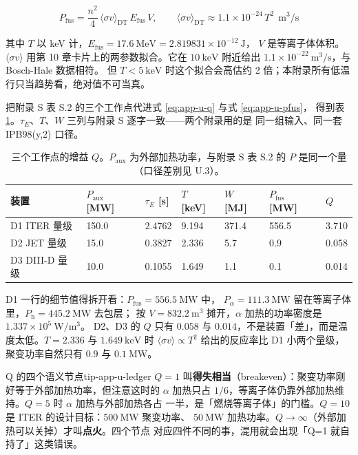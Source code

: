 \begin{equation}
P_{\mathrm{fus}} = \frac{n^2}{4}\,\langle\sigma v\rangle_{\mathrm{DT}}\,E_{\mathrm{fus}}\,V,
\qquad
\langle\sigma v\rangle_{\mathrm{DT}} \approx 1.1\times10^{-24}\,T^2\ \ \mathrm{m^3/s}
\label{eq:app-u-pfus}
\end{equation}

其中 $T$ 以 keV 计，$E_{\mathrm{fus}} = 17.6\ \mathrm{MeV} = 2.819831\times10^{-12}\ \mathrm{J}$，
$V$ 是等离子体体积。$\langle\sigma v\rangle$ 用第 10 章卡片上的两参数拟合。它在
$10\ \mathrm{keV}$ 附近给出 $1.1\times10^{-22}\ \mathrm{m^3/s}$，与 Bosch-Hale 数据相符。
但 $T<5\ \mathrm{keV}$ 时这个拟合会高估约 2 倍；本附录所有低温行只当趋势看，绝对值不可当真。

把附录 S 表 S.2 的三个工作点代进式 \eqref{eq:app-u-q} 与式 \eqref{eq:app-u-pfus}，
得到表 \ref{tab:app-u-accounts}。$\tau_E$、$T$、$W$ 三列与附录 S 逐字一致——两个附录用的是
同一组输入、同一套 IPB98(y,2) 口径。

\begin{table}[htbp]
\centering
\small
\caption{三个工作点的增益 $Q$。$P_{\mathrm{aux}}$ 为外部加热功率，与附录 S 表 S.2 的
$P$ 是同一个量（口径差别见 U.3）。}
\label{tab:app-u-accounts}
\begin{tabular}{@{}p{3.2cm}p{1.8cm}p{1.8cm}p{1.6cm}p{1.7cm}p{1.8cm}p{1.6cm}@{}}
\toprule
装置 & $P_{\mathrm{aux}}$ [MW] & $\tau_E$ [s] & $T$ [keV] & $W$ [MJ] & $P_{\mathrm{fus}}$ [MW] & $Q$ \\
\midrule
D1 ITER 量级    & 150.0 & 2.4762 & 9.194 & 371.4 & 556.5 & 3.710 \\
D2 JET 量级     & 15.0  & 0.3827 & 2.336 & 5.7   & 0.9   & 0.058 \\
D3 DIII-D 量级  & 10.0  & 0.1055 & 1.649 & 1.1   & 0.1   & 0.014 \\
\bottomrule
\end{tabular}

\end{table}

D1 一行的细节值得拆开看：$P_{\mathrm{fus}}=556.5\ \mathrm{MW}$ 中，
$P_\alpha = 111.3\ \mathrm{MW}$ 留在等离子体里，$P_{\mathrm{n}} = 445.2\ \mathrm{MW}$ 去包层；
按 $V=832.2\ \mathrm{m^3}$ 摊开，$\alpha$ 加热的功率密度是 $1.337\times10^{5}\ \mathrm{W/m^3}$。
D2、D3 的 $Q$ 只有 $0.058$ 与 $0.014$，不是装置「差」，而是温度太低。$T=2.336$ 与
$1.649\ \mathrm{keV}$ 时 $\langle\sigma v\rangle \propto T^2$ 给出的反应率比 D1 小两个量级，
聚变功率自然只有 $0.9$ 与 $0.1\ \mathrm{MW}$。

\begin{tip}{Q 的四个语义节点}{tip-app-u-ledger}
$Q=1$ 叫\textbf{得失相当}（breakeven）：聚变功率刚好等于外部加热功率，但注意这时的
$\alpha$ 加热只占 $1/6$，等离子体仍靠外部加热维持。$Q=5$ 时 $\alpha$ 加热与外部加热各占
一半，是「燃烧等离子体」的门槛。$Q=10$ 是 ITER 的设计目标：$500\ \mathrm{MW}$ 聚变功率、
$50\ \mathrm{MW}$ 加热功率。$Q\to\infty$（外部加热可以关掉）才叫\textbf{点火}。四个节点
对应四件不同的事，混用就会出现「Q=1 就自持了」这类错误。
\end{tip}

